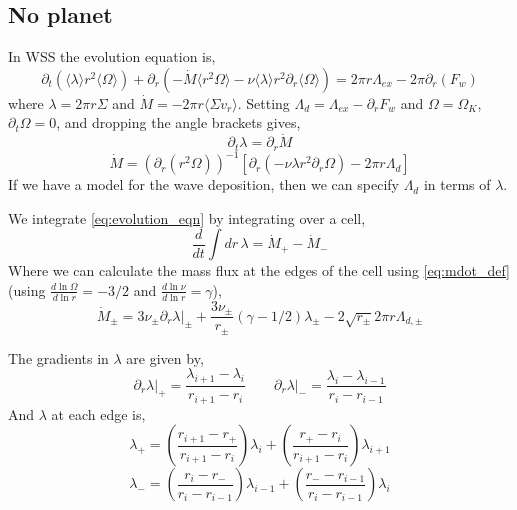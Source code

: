 \documentclass{article}
\begin{document}
\subsection{No planet}
In WSS the evolution equation is,
\begin{equation}
\partial_t(\langle \lambda \rangle r^2 \langle \Omega \rangle) + \partial_r( -\dot{M}  \langle r^2 \Omega \rangle  - \nu \langle \lambda \rangle  r^2 \partial_r \langle \Omega \rangle) = 2\pi r \Lambda_{ex} - 2 \pi \partial_r (F_w) 
\end{equation}
where $\lambda = 2\pi r \Sigma$ and $\dot{M} = -2\pi r\langle \Sigma v_r\rangle$. Setting $\Lambda_d = \Lambda_{ex} - \partial_r F_w$ and $\Omega = \Omega_K$, $\partial_t \Omega = 0$, and dropping the angle brackets gives,
\begin{equation} \label{eq:evolution_eqn}
\partial_t \lambda = \partial_r \dot{M}
\end{equation}
\begin{equation} \label{eq:mdot_def}
\dot{M} = \left( \partial_r (r^2 \Omega) \right)^{-1} \left[ \partial_r(- \nu \lambda r^2 \partial_r \Omega ) - 2 \pi r \Lambda_d \right]
\end{equation}
If we have a model for the wave deposition, then we can specify $\Lambda_d$ in terms of $\lambda$. 

We integrate \eqref{eq:evolution_eqn} by integrating over a cell,
\begin{equation}
\frac{d}{dt} \int dr \, \lambda = \dot{M}_+ - \dot{M}_-
\end{equation}          
Where we can calculate the mass flux at the edges of the cell using \eqref{eq:mdot_def} (using $ \frac{d \ln \Omega}{d \ln r} = -3/2$ and $\frac{d \ln \nu}{d \ln r} = \gamma$),
\begin{equation}
\dot{M}_\pm = 3 \nu_\pm \left. \partial_r \lambda \right|_\pm +  \frac{3 \nu_\pm}{r_\pm} \left( \gamma -1/2\right) \lambda_\pm - 2 \sqrt{r_\pm} 2 \pi r \Lambda_{d,\pm}
\end{equation}

The gradients in $\lambda$ are given by,
\begin{equation}
\left. \partial_r \lambda \right|_+ = \frac{ \lambda_{i+1} - \lambda_i}{r_{i+1} - r_{i}} \qquad \left. \partial_r \lambda \right|_- = \frac{ \lambda_{i} - \lambda_{i-1}}{r_{i} - r_{i-1}}
\end{equation}
And $\lambda$ at each edge is,
\begin{equation}
\lambda_+ = \left( \frac{ r_{i+1} -r_+}{r_{i+1}-r_i} \right) \lambda_i + \left( \frac{r_+ - r_i}{r_{i+1}-r_i} \right) \lambda_{i+1}
\end{equation}
\begin{equation}
\lambda_- = \left( \frac{ r_{i} -r_-}{r_{i}-r_{i-1}} \right) \lambda_{i-1} + \left( \frac{r_- - r_{i-1}}{r_{i}-r_{i-1}} \right) \lambda_{i}
\end{equation}
\end{document}
